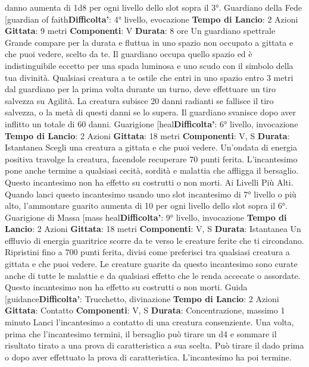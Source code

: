 \begin{multicols}{2}
danno aumenta di 1d8 per ogni livello dello slot sopra il
3°.
Guardiano della Fede
[guardian of faith\textbf{Difficolta'}:
4° livello, evocazione
\textbf{Tempo di Lancio}: 2 Azioni
\textbf{Gittata}: 9 metri
\textbf{Componenti}: V
\textbf{Durata}: 8 ore
Un guardiano spettrale Grande compare per la durata e
fluttua in uno spazio non occupato a gittata e che puoi
vedere, scelto da te. Il guardiano occupa quello spazio
ed è indistinguibile eccetto per una spada luminosa e
uno scudo con il simbolo della tua divinità.
Qualsiasi creatura a te ostile che entri in uno spazio
entro 3 metri dal guardiano per la prima volta durante
un turno, deve effettuare un tiro salvezza su Agilità.
La creatura subisce 20 danni radianti se fallisce il tiro
salvezza, o la metà di questi danni se lo supera. Il
guardiano svanisce dopo aver inflitto un totale di 60
danni.
Guarigione
[heal\textbf{Difficolta'}:
6° livello, invocazione
\textbf{Tempo di Lancio}: 2 Azioni
\textbf{Gittata}: 18 metri
\textbf{Componenti}: V, S
\textbf{Durata}: Istantanea
Scegli una creatura a gittata e che puoi vedere.
Un’ondata di energia positiva travolge la creatura,
facendole recuperare 70 punti ferita. L’incantesimo
pone anche termine a qualsiasi cecità, sordità e
malattia che affligga il bersaglio. Questo incantesimo
non ha effetto su costrutti o non morti.
Ai Livelli Più Alti. Quando lanci questo incantesimo
usando uno slot incantesimo di 7° livello o più alto,
l’ammontare guarito aumenta di 10 per ogni livello dello
slot sopra il 6°.
Guarigione di Massa
[mass heal\textbf{Difficolta'}:
9° livello, invocazione
\textbf{Tempo di Lancio}: 2 Azioni
\textbf{Gittata}: 18 metri
\textbf{Componenti}: V, S
\textbf{Durata}: Istantanea
Un effluvio di energia guaritrice scorre da te verso le
creature ferite che ti circondano. Ripristini fino a 700
punti ferita, divisi come preferisci tra qualsiasi creatura
a gittata e che puoi vedere. Le creature guarite da
questo incantesimo sono curate anche di tutte le
malattie e da qualsiasi effetto che le renda accecate o
assordate. Questo incantesimo non ha effetto su
costrutti o non morti.
Guida
[guidance\textbf{Difficolta'}:
Trucchetto, divinazione
\textbf{Tempo di Lancio}: 2 Azioni
\textbf{Gittata}: Contatto
\textbf{Componenti}: V, S
\textbf{Durata}: Concentrazione, massimo 1 minuto
Lanci l’incantesimo a contatto di una creatura
consenziente. Una volta, prima che l’incantesimo
termini, il bersaglio può tirare un d4 e sommare il
risultato tirato a una prova di caratteristica a sua scelta.
Può tirare il dado prima o dopo aver effettuato la prova
di caratteristica. L’incantesimo ha poi termine.

\end{multicols}
